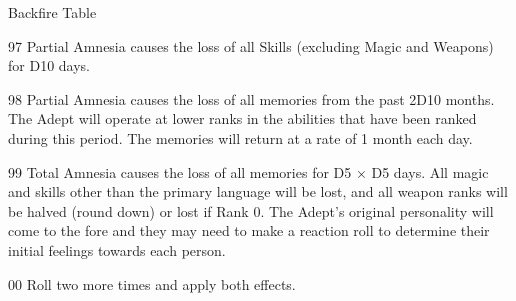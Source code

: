 \begin{Chapter}{Backfire Table}
\begin{Description}
\item[97] Partial Amnesia causes the loss of all Skills (excluding
  Magic and Weapons) for D10 days.

\item[98] Partial Amnesia causes the loss of all memories from the
  past 2D10 months.  The Adept will operate at lower ranks in the
  abilities that have been ranked during this period. The memories
  will return at a rate of 1 month each day.

\item[99] Total Amnesia causes the loss of all memories for D5 × D5
  days. All magic and skills other than the primary language will be
  lost, and all weapon ranks will be halved (round down) or lost if
  Rank 0.  The Adept’s original personality will come to the fore and
  they may need to make a reaction roll to determine their initial
  feelings towards each person.

\item[00] Roll two more times and apply both effects.

\end{Description}

\end{Chapter}
